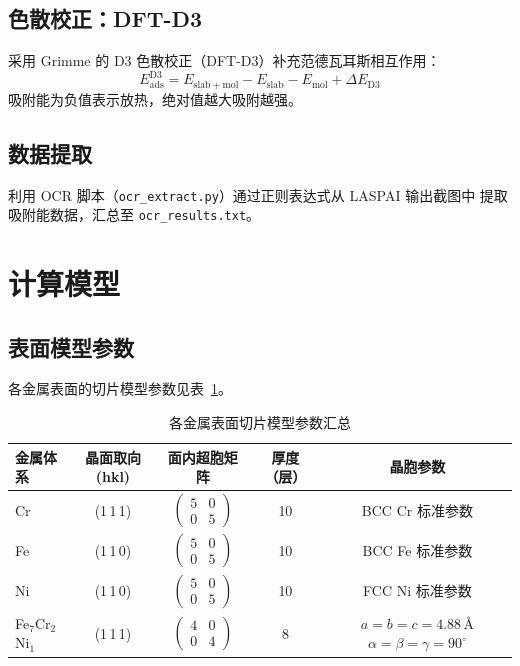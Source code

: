 \documentclass[12pt, a4paper]{article}
\begin{document}
\subsection{色散校正：DFT-D3}

采用 Grimme 的 D3 色散校正（DFT-D3）补充范德瓦耳斯相互作用：
\begin{equation}
  E_{\mathrm{ads}}^{\mathrm{D3}} = E_{\mathrm{slab+mol}} - E_{\mathrm{slab}} - E_{\mathrm{mol}} + \Delta E_{\mathrm{D3}}
\end{equation}
吸附能为负值表示放热，绝对值越大吸附越强。

\subsection{数据提取}

利用 OCR 脚本（\texttt{ocr\_extract.py}）通过正则表达式从 LASPAI 输出截图中
提取吸附能数据，汇总至 \texttt{ocr\_results.txt}。

\section{计算模型}

\subsection{表面模型参数}

各金属表面的切片模型参数见表~\ref{tab:slab}。

\begin{table}[H]
  \centering
  \caption{各金属表面切片模型参数汇总}
  \label{tab:slab}
  \begin{tabular}{lcccc}
    \toprule
    \textbf{金属体系} & \textbf{晶面取向 (hkl)} & \textbf{面内超胞矩阵} & \textbf{厚度（层）} & \textbf{晶胞参数} \\
    \midrule
    Cr                  & (1\,1\,1) & $\begin{pmatrix}5&0\\0&5\end{pmatrix}$ & 10 & BCC Cr 标准参数 \\[6pt]
    Fe                  & (1\,1\,0) & $\begin{pmatrix}5&0\\0&5\end{pmatrix}$ & 10 & BCC Fe 标准参数 \\[6pt]
    Ni                  & (1\,1\,0) & $\begin{pmatrix}5&0\\0&5\end{pmatrix}$ & 10 & FCC Ni 标准参数 \\[6pt]
    Fe$_7$Cr$_2$Ni$_1$ & (1\,1\,1) & $\begin{pmatrix}4&0\\0&4\end{pmatrix}$ & 8  &
      \makecell[l]{$a=b=c=4.88$\,\AA\\$\alpha=\beta=\gamma=90^\circ$} \\
    \bottomrule
  \end{tabular}
\end{table}
\end{document}

